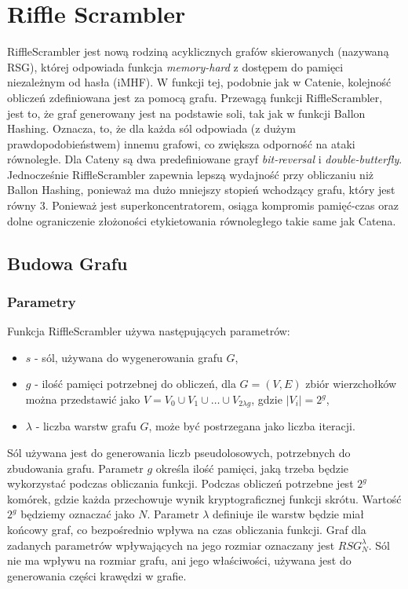 \chapter{Riffle Scrambler}
\thispagestyle{chapterBeginStyle}

RiffleScrambler \cite{rs} jest nową rodziną acyklicznych grafów skierowanych (nazywaną RSG), której odpowiada funkcja \textit{memory-hard} z dostępem do pamięci niezależnym od hasła (iMHF).
W funkcji tej, podobnie jak w Catenie, kolejność obliczeń zdefiniowana jest za pomocą grafu. 
Przewagą funkcji RiffleScrambler, jest to, że graf generowany jest na podstawie soli, tak jak w funkcji Ballon Hashing. Oznacza, to, że dla każda sól odpowiada (z dużym prawdopodobieństwem) innemu grafowi, co zwiększa odporność na ataki równoległe. Dla Cateny są dwa predefiniowane grayf \textit{bit-reversal} i \textit{double-butterfly}.
Jednocześnie RiffleScrambler zapewnia lepszą wydajność przy obliczaniu niż Ballon Hashing, ponieważ ma dużo mniejszy stopień wchodzący grafu, który jest równy 3.
Ponieważ jest superkoncentratorem, osiąga kompromis pamięć-czas oraz dolne ograniczenie złożoności etykietowania równoległego takie same jak Catena.

\section{Budowa Grafu}

\subsection{Parametry}
Funkcja RiffleScrambler używa następujących parametrów:
\begin{itemize}
	\item $s$ - sól, używana do wygenerowania grafu $G$,
	
	\item $g$ - ilość pamięci potrzebnej do obliczeń, dla $G = (V, E)$ zbiór wierzchołków można przedstawić jako $V = V_{0} \cup V_{1} \cup \dots \cup V_{2 \lambda g}$, gdzie $|V_{i}| = 2^{g}$,
	
	\item $\lambda$ - liczba warstw grafu $G$, może być postrzegana jako liczba iteracji.
\end{itemize}

Sól używana jest do generowania liczb pseudolosowych, potrzebnych do zbudowania grafu.
Parametr $g$ określa ilość pamięci, jaką trzeba będzie wykorzystać podczas obliczania funkcji. Podczas obliczeń potrzebne jest $2^{g}$ komórek, gdzie każda przechowuje wynik kryptograficznej funkcji skrótu. Wartość $2^g$ będziemy oznaczać jako $N$.
Parametr $\lambda$ definiuje ile warstw będzie miał końcowy graf, co bezpośrednio wpływa na czas obliczania funkcji.
Graf dla zadanych parametrów wpływających na jego rozmiar oznaczany jest $RSG_{N}^{\lambda}$. Sól nie ma wpływu na rozmiar grafu, ani jego właściwości, używana jest do generowania części krawędzi w grafie.



